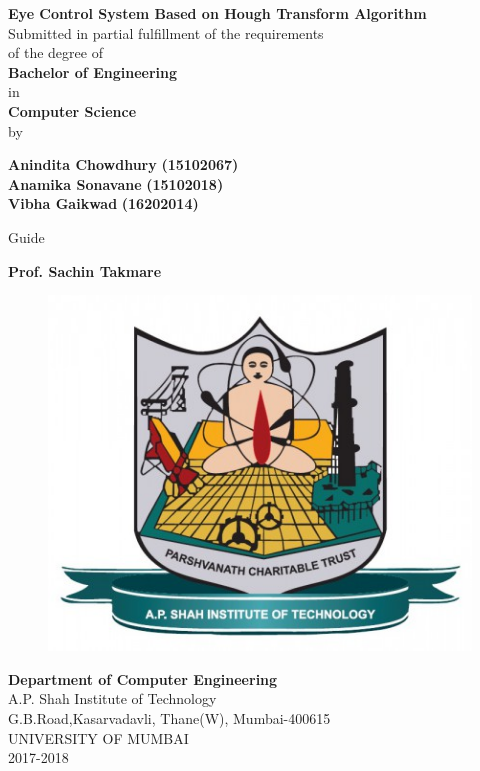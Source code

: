 \begin{titlepage}
\vspace*{0.25cm}
{\centering
{\Large\textbf {Eye Control System Based on Hough Transform
Algorithm}}\\
\vspace{1cm}
 Submitted in partial fulfillment of the requirements\\
of the degree of\\ \vspace{1cm}
{\large\textbf {Bachelor of Engineering}}\\
\vspace{0.5cm}
in \\
\vspace{0.5cm}
{\large\textbf {Computer Science}}\\
\vspace{0.5cm}
by\\
\vspace{0.5cm}

{\large \textbf {Anindita Chowdhury}} {\large \textbf {(15102067)}}\\
\vspace{0.2cm}
{\large \textbf {Anamika Sonavane}} {\large \textbf {(15102018)}}\\
\vspace{0.2cm}
{\large \textbf {Vibha Gaikwad}} {\large \textbf {(16202014)}}\\
\vspace{1cm}

Guide \\ 
\vspace{0.3cm}

\hspace{.05cm} {\large \textbf {Prof. Sachin Takmare}}\\
\vspace{1.5cm}
\begin{figure}[h]
\centering
\includegraphics[scale=0.30]{apsit_logo.jpg}
\end{figure}

\hspace{.05cm}
\hspace{.05cm}

{\textbf {Department of Computer Engineering}}\\
A.P. Shah Institute of Technology\\
G.B.Road,Kasarvadavli, Thane(W), Mumbai-400615\\
UNIVERSITY OF MUMBAI\\
2017-2018\\}
\end{titlepage}